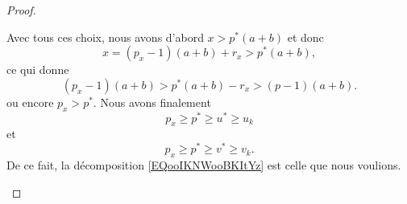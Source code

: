 \begin{proof}
\begin{subproof}
		\spitem[Conclusion]

		Avec tous ces choix, nous avons d'abord \( x>p^*(a+b)\) et donc
		\begin{equation}
			x=(p_x-1)(a+b)+r_x>p^*(a+b),
		\end{equation}
		ce qui donne
		\begin{equation}
			(p_x-1)(a+b)>p^*(a+b)-r_x>(p-1)(a+b).
		\end{equation}
		ou encore \( p_x>p^*\). Nous avons finalement
		\begin{equation}
			p_x \geq p^* \geq u^* \geq u_k
		\end{equation}
		et
		\begin{equation}
			p_x \geq p^* \geq v^* \geq v_k.
		\end{equation}
		De ce fait, la décomposition \eqref{EQooIKNWooBKItYz} est celle que nous voulions.
	\end{subproof}
\end{proof}


%
%
%

